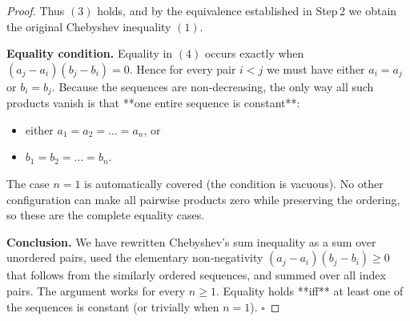 \begin{proof}
Thus \((3)\) holds, and by the equivalence established in Step 2 we obtain
the original Chebyshev inequality \((1)\).

\medskip\noindent\textbf{Equality condition.}  
Equality in \((4)\) occurs exactly when \((a_{j}-a_{i})(b_{j}-b_{i})=0\).
Hence for every pair \(i<j\) we must have either \(a_{i}=a_{j}\) or
\(b_{i}=b_{j}\).  Because the sequences are non‑decreasing, the only way
all such products vanish is that **one entire sequence is constant**:

\begin{itemize}
\item either \(a_{1}=a_{2}= \dots =a_{n}\), or
\item \(b_{1}=b_{2}= \dots =b_{n}\).
\end{itemize}
The case \(n=1\) is automatically covered (the condition is vacuous).
No other configuration can make all pairwise products zero while preserving
the ordering, so these are the complete equality cases.

\medskip\noindent\textbf{Conclusion.}  
We have rewritten Chebyshev’s sum inequality as a sum over unordered pairs,
used the elementary non‑negativity \((a_{j}-a_{i})(b_{j}-b_{i})\ge0\) that
follows from the similarly ordered sequences, and summed over all index
pairs.  The argument works for every \(n\ge1\).  Equality holds **iff** at
least one of the sequences is constant (or trivially when \(n=1\)). \(\square\)
\end{proof}
